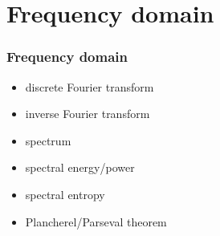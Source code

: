 
\section{Frequency domain}

\begin{frame}
	\frametitle{Frequency domain}
	\begin{itemize}
		\item discrete Fourier transform
		\item inverse Fourier transform
		\item spectrum
		\item spectral energy/power
		\item spectral entropy
		\item Plancherel/Parseval theorem
	\end{itemize}
\end{frame}

